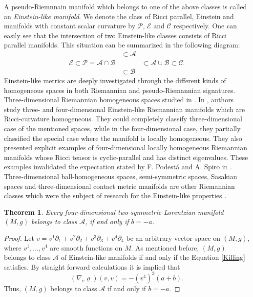 \documentclass[11pt,oneside,leqno]{amsart}
\theoremstyle{plain}
\newtheorem{theorem}{Theorem}[section]
\begin{document}
A pseudo-Riemnnain manifold which belongs to one of the above classes is called an {\em Einstein-like manifold}. We denote the class of Ricci parallel, Einstein and manifolds with constant scalar curvature by $\mathcal P$, $\mathcal E$ and $\mathcal C$ respectively. One can easily see that the intersection of two Einstein-like classes consists of Ricci parallel manifolds. This situation can be summarized in the following diagram:
$$
\begin{array}{ccc}
&\subset{\mathcal A}&\\
\mathcal E\subset\mathcal P={\mathcal A}\cap{\mathcal B}&&\subset{\mathcal A}\cup{\mathcal B}\subset\mathcal C.\\
&\subset{\mathcal B}&
\end{array}
$$
Einstein-like metrics are deeply investigated through the different kinds of homogeneous spaces in both Riemannian and pseudo-Riemannian signatures. Three-dimensional Riemannian homogeneous spaces studied in \cite{Ab}. In \cite{Bu}, authors study three- and four-dimensional Einstein-like Riemannian manifolds which are Ricci-curvature homogeneous. They could completely classify three-dimensional case of the mentioned spaces, while in the four-dimensional case, they partially classified the special case where the manifold is locally homogeneous. They also presented explicit examples of four-dimensional locally homogeneous Riemannian manifolds whose Ricci tensor is cyclic-parallel and has distinct eigenvalues. These examples invalidated the expectation stated by F. Podest{\'a} and A. Spiro in \cite{Po}. Three-dimensional ball-homogeneous spaces, semi-symmetric spaces, Sasakian spaces and three-dimensional contact metric manifolds are other Riemannian classes which were the subject of research for the Einstein-like properties \cite{Ca1,Bo,Ab1,Ca2}.
\vspace{.3cm}
\begin{theorem}\label{A}
Every four-dimensional two-symmetric Lorentzian manifold $(M,g)$ belongs to class ${\mathcal A}$, if and only if $b=-a$.
\end{theorem}
\begin{proof}
Let $v=v^1{\partial}_1+v^2{\partial}_2+v^3{\partial}_3+v^4{\partial}_4$ be an arbitrary vector space on $(M,g)$, where $v^1,\dots,v^4$ are smooth functions on $M$. As mentioned before, $(M,g)$ belongs to class ${\mathcal A}$ of Einstein-like manifolds if and only if the Equation \eqref{Killing} satisfies. By straight forward calculations it is implied that
$$
(\nabla_v\varrho)(v,v)=-(v^4)^3(a+b).
$$
Thus, $(M,g)$ belongs to class ${\mathcal A}$ if and only if $b=-a$.
\end{proof}
\end{document}
